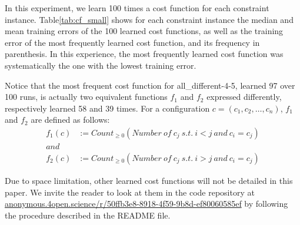 \documentclass{article}
\begin{document}

In  this experiment,  we  learn 100  times a  cost  function for  each
constraint instance. Table\ref{tab:cf_small} shows for each constraint
instance the median  and mean training errors of the  100 learned cost
functions,  as well  as  the  training error  of  the most  frequently
learned  cost function,  and  its frequency  in  parenthesis. In  this
experience,   the   most   frequently  learned   cost   function   was
systematically the one with the lowest training error.

Notice that  the most  frequent cost function  for all\_different-4-5,
learned 97 over  100 runs, is actually two  equivalent functions $f_1$
and $f_2$ expressed differently, respectively learned 58 and 39 times.
For a configuration $c = (c_1, c_2, \ldots, c_n)$, $f_1$ and $f_2$ are
defined as follows:
\begin{align*}
  f_1(c) &:= Count_{\geq 0}( Number\ of\ c_j\ s.t.\ i<j\ and\ c_i=c_j)\\
  and&\\
  f_2(c) &:= Count_{\geq 0}( Number\ of\ c_j\ s.t.\ i>j\ and\ c_i=c_j)
\end{align*}

Due  to space  limitation, other  learned cost  functions will  not be
detailed in this paper.   We invite the reader to look  at them in the
code                           repository                           at
\href{https://anonymous.4open.science/r/50ffb3e8-8918-4f59-9b8d-ef80060585ef/}{anonymous.4open.science/r/50ffb3e8-8918-4f59-9b8d-ef80060585ef}
by following the procedure described in the README file.


\end{document}
